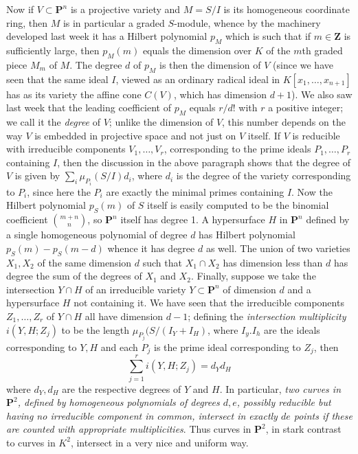 \documentclass[10pt]{article}
\begin{document}
Now if $V\subset\mathbf P^n$ is a projective variety and $M=S/I$ is its
homogeneous coordinate ring, then $M$ is in particular a graded
$S$-module, whence by the machinery developed last week it has a Hilbert
polynomial $p_M$ which is such that if $m\in\mathbf Z$ is sufficiently
large, then $p_M(m)$ equals the dimension over $K$ of the $m$th graded
piece $M_m$ of $M$. The degree $d$ of $p_M$ is then the dimension of $V$
(since we have seen that the same ideal $I$, viewed as an ordinary
radical ideal in $K[x_1,\ldots,x_{n+1}]$ has as its variety the affine
cone $C(V)$, which has dimension $d+1$). We also saw last week that the
leading coefficient of $p_M$ equals $r/d!$ with $r$ a positive integer;
we call it the {\sl degree} of $V$; unlike the dimension of $V$, this
number depends on the way $V$ is embedded in projective space and not
just on $V$ itself. If $V$ is reducible with irreducible components
$V_1,\ldots,V_r$, corresponding to the prime ideals $P_1,\ldots,P_r$
containing $I$, then the discussion in the above paragraph shows that
the degree of $V$ is given by $\sum_i \mu_{P_i}(S/I) d_i$, where $d_i$
is the degree of the variety corresponding to $P_i$, since here the
$P_i$ are exactly the minimal primes containing $I$. Now the Hilbert
polynomial $p_S(m)$ of $S$ itself is easily computed to be the binomial
coefficient $m+n\choose n$, so $\mathbf P^n$ itself has degree 1. A
hypersurface $H$ in $\mathbf P^n$ defined by a single homogeneous
polynomial of degree $d$ has Hilbert polynomial $p_S(m) - p_S(m-d)$
whence it has degree $d$ as well. The union of two varieties $X_1,X_2$
of the same dimension $d$ such that $X_1\cap X_2$ has dimension less
than $d$ has degree the sum of the degrees of $X_1$ and $X_2$. Finally,
suppose we take the intersection $Y\cap H$ of an irreducible variety
$Y\subset\mathbf P^n$ of dimension $d$ and a hypersurface $H$ not
containing it. We have seen that the irreducible components
$Z_1,\ldots,Z_r$ of $Y\cap H$ all have dimension $d-1$; defining the
{\sl intersection multiplicity} $i(Y,H;Z_j)$ to be the length
$\mu_{P_j}(S/(I_Y + I_H)$, where $I_y.I_h$ are the ideals corresponding
to $Y,H$ and each $P_j$ is the prime ideal corresponding to $Z_j$, then
 $$
 \sum_{j=1}^r i(Y,H;Z_j) = d_Y d_H
 $$
 \noindent where $d_Y,d_H$ are the respective degrees of $Y$ and $H$. In
 particular, {\sl two curves in $\mathbf P^2$, defined by homogeneous
   polynomials of degrees $d,e$, possibly reducible but having no
   irreducible component in common, intersect in exactly $de$ points if
   these are counted with appropriate multiplicities}. Thus curves in
 $\mathbf P^2$, in stark contrast to curves in $K^2$, intersect in a
 very nice and uniform way.
\end{document}
